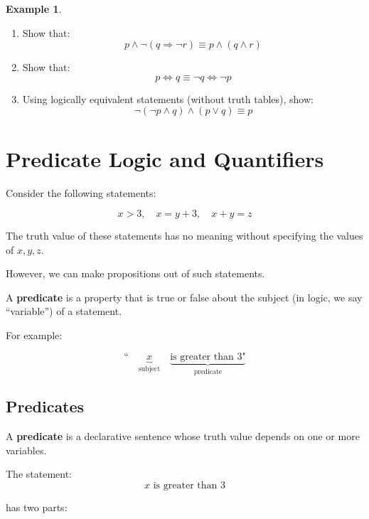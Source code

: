 \documentclass[
]{book}
\theoremstyle{definition}
\theoremstyle{definition}
\newtheorem{example}{Example}[chapter]
\theoremstyle{definition}
\theoremstyle{definition}
\theoremstyle{remark}
\begin{document}
\begin{example}
\protect\hypertarget{exm:unnamed-chunk-41}{}\label{exm:unnamed-chunk-41}\leavevmode

\begin{enumerate}
\def\labelenumi{\arabic{enumi}.}
\item
  Show that:\\
  \[
  p \land \neg (q \Rightarrow \neg r) \equiv p \land (q \land r)
  \]
\item
  Show that:\\
  \[
  p \Leftrightarrow q \equiv \neg q \Leftrightarrow \neg p
  \]
\item
  Using logically equivalent statements (without truth tables), show:\\
  \[
  \neg (\neg p \land q) \land (p \lor q) \equiv p
  \]
\end{enumerate}

\end{example}

\section{Predicate Logic and Quantifiers}\label{predicate-logic-and-quantifiers}

Consider the following statements:

\[
x > 3, \quad x = y + 3, \quad x + y = z
\]

The truth value of these statements has no meaning without specifying the values of \(x, y, z\).

However, we can make propositions out of such statements.

A \textbf{predicate} is a property that is true or false about the subject (in logic, we say ``variable'') of a statement.

For example:

\[
\text{``} \quad \underbrace{x}_{\text{subject}} \quad \underbrace{\text{is greater than 3"}}_{\text{predicate}} 
\]

\subsection{Predicates}\label{predicates}

A \textbf{predicate} is a declarative sentence whose truth value depends on one or more variables.

The statement:
\[
x \text{ is greater than } 3
\]

has two parts:
\end{document}
